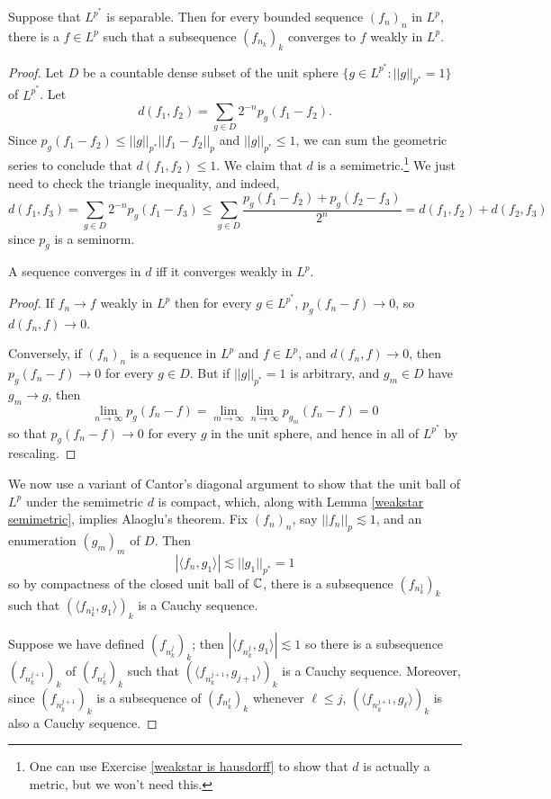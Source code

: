 \begin{theorem}
Suppose that $L^{p^*}$ is separable. Then for every bounded sequence $(f_n)_n$ in $L^p$, there is a $f \in L^p$ such that a subsequence $(f_{n_k})_k$ converges to $f$ weakly in $L^p$.
\end{theorem}
\begin{proof}
Let $D$ be a countable dense subset of the unit sphere $\{g \in L^{p^*}: ||g||_{p^*} = 1\}$ of $L^{p^*}$.
Let
\[d(f_1, f_2) = \sum_{g \in D} 2^{-n} p_g(f_1 - f_2).\]
Since $p_g(f_1 - f_2) \leq ||g||_{p^*} ||f_1 - f_2||_p$ and $||g||_{p^*} \leq 1$, we can sum the geometric series to conclude that $d(f_1, f_2) \leq 1$.
We claim that $d$ is a semimetric.\footnote{One can use Exercise \ref{weakstar is hausdorff} to show that $d$ is actually a metric, but we won't need this.}
We just need to check the triangle inequality, and indeed,
\[d(f_1, f_3) = \sum_{g \in D} 2^{-n} p_g(f_1 - f_3) \leq \sum_{g \in D} \frac{p_g(f_1 - f_2) + p_g(f_2 - f_3)}{2^n} = d(f_1, f_2) + d(f_2, f_3)\]
since $p_g$ is a seminorm.

\begin{lemma}
\label{weakstar semimetric}
A sequence converges in $d$ iff it converges weakly in $L^p$.
\end{lemma}
\begin{proof}
If $f_n \to f$ weakly in $L^p$ then for every $g \in L^{p^*}$, $p_g(f_n - f) \to 0$, so $d(f_n, f) \to 0$.

Conversely, if $(f_n)_n$ is a sequence in $L^p$ and $f \in L^p$, and $d(f_n, f) \to 0$, then $p_g(f_n - f) \to 0$ for every $g \in D$.
But if $||g||_{p^*} = 1$ is arbitrary, and $g_m \in D$ have $g_m \to g$, then
\[\lim_{n \to \infty} p_g(f_n - f) = \lim_{m \to \infty} \lim_{n \to \infty} p_{g_m}(f_n - f) = 0\]
so that $p_g(f_n - f) \to 0$ for every $g$ in the unit sphere, and hence in all of $L^{p^*}$ by rescaling.
\end{proof}

We now use a variant of Cantor's diagonal argument to show that the unit ball of $L^p$ under the semimetric $d$ is compact, which, along with Lemma \ref{weakstar semimetric}, implies Alaoglu's theorem.
Fix $(f_n)_n$, say $||f_n||_p \lesssim 1$, and an enumeration $(g_m)_m$ of $D$.
Then
\[|\langle f_n, g_1\rangle| \lesssim ||g_1||_{p^*} = 1\]
so by compactness of the closed unit ball of $\mathbb{C}$, there is a subsequence $(f_{n_k^1})_k$ such that $(\langle f_{n_k^1}, g_1\rangle)_k$ is a Cauchy sequence.

Suppose we have defined $(f_{n_k^j})_k$; then $|\langle f_{n_k^j}, g_1\rangle| \lesssim 1$ so there is a subsequence $(f_{n_k^{j+1}})_k$ of $(f_{n_k^j})_k$ such that $(\langle f_{n_k^{j+1}}, g_{j+1}\rangle)_k$ is a Cauchy sequence.
Moreover, since $(f_{n_k^{j+1}})_k$ is a subsequence of $(f_{n_k^\ell})_k$ whenever $\ell \leq j$, $(\langle f_{n_k^{j+1}}, g_\ell\rangle)_k$ is also a Cauchy sequence.


\end{proof}
